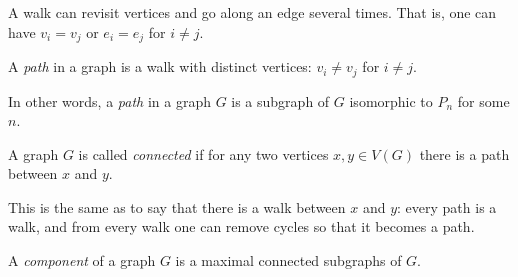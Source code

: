 \begin{page}

\begin{rem}
A walk can revisit vertices and go along an edge several times.
That is, one can have $v_i = v_j$ or $e_i = e_j$ for $i \ne j$.
\end{rem}

\end{page}

\begin{page}

\begin{dfn}
\label{dfn:PathCycle}
A \emph{path} in a graph is a walk with distinct vertices: $v_i \ne v_j$ for $i \ne j$.
\end{dfn}

\end{page}

\begin{page}

In other words, a \emph{path} in a graph $G$ is a subgraph of $G$ isomorphic to $P_n$ for some $n$.


\end{page}

\begin{page}

\begin{dfn}
A graph $G$ is called \emph{connected} if for any two vertices $x, y \in V(G)$ there is a path between $x$ and $y$.
\end{dfn}

\end{page}

\begin{page}


This is the same as to say that there is a walk between $x$ and $y$:
every path is a walk, and from every walk one can remove cycles so that it becomes a path.


\end{page}

\begin{page}

\begin{dfn}
A \emph{component} of a graph $G$ is a maximal connected subgraphs of $G$.
\end{dfn}

\end{page}

